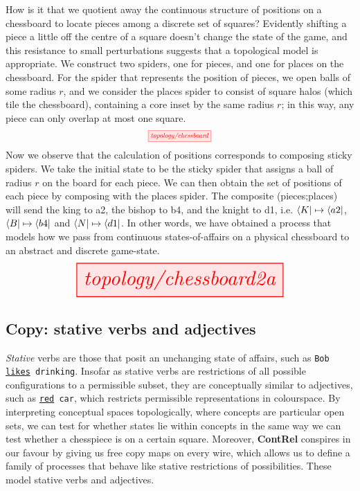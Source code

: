 \begin{myboxB}
\begin{example}\label{ex:chessboard}
How is it that we quotient away the continuous structure of positions on a chessboard to locate pieces among a discrete set of squares? Evidently shifting a piece a little off the centre of a square doesn't change the state of the game, and this resistance to small perturbations suggests that a topological model is appropriate. We construct two spiders, one for pieces, and one for places on the chessboard. For the spider that represents the position of pieces, we open balls of some radius $r$, and we consider the places spider to consist of square halos (which tile the chessboard), containing a core inset by the same radius $r$; in this way, any piece can only overlap at most one square.
\[\scalebox{0.70}{\tikzfig{topology/chessboard}}\]
Now we observe that the calculation of positions corresponds to composing sticky spiders. We take the initial state to be the sticky spider that assigns a ball of radius $r$ on the board for each piece. We can then obtain the set of positions of each piece by composing with the places spider. The composite (pieces;places)
will send the king to a2, the bishop to b4, and the knight to d1, i.e. $\bra{K} \mapsto \bra{a2}$, $\bra{B} \mapsto \bra{b4}$ and $\bra{N} \mapsto \bra{d1}$. In other words, we have obtained a process that models how we pass from continuous states-of-affairs on a physical chessboard to an abstract and discrete game-state.
\[\resizebox{0.70\textwidth}{!}{\tikzfig{topology/chessboard2a}}\]
\end{example}
\end{myboxB}
\clearpage

\subsection{Copy: stative verbs and adjectives}

\emph{Stative} verbs are those that posit an unchanging state of affairs, such as \texttt{Bob \underline{likes} drinking}. Insofar as stative verbs are restrictions of all possible configurations to a permissible subset, they are conceptually similar to adjectives, such as \texttt{\underline{red} car}, which restricts permissible representations in colourspace. By interpreting conceptual spaces topologically, where concepts are particular open sets, we can test for whether states lie within concepts in the same way we can test whether a chesspiece is on a certain square. Moreover, \textbf{ContRel} conspires in our favour by giving us free copy maps on every wire, which allows us to define a family of processes that behave like stative restrictions of possibilities. These model stative verbs and adjectives.

